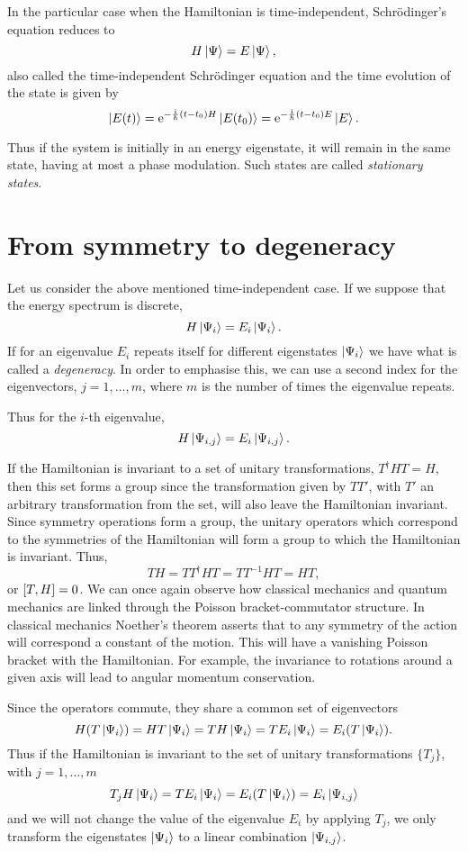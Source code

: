 \documentclass[../thesis.tex]{subfiles}
\theoremstyle{definition}
\begin{document}
In the particular case when the Hamiltonian is time-independent, Schrödinger's equation
reduces to
\[
  H \ket{\Psi} = E \ket{\Psi},
\]
also called the time-independent Schrödinger equation and the time evolution of
the state is given by
\[
  \ket{E(t)} = \operatorname{e}^{-\frac{\mathrm{i}}{\hbar} (t-t_0) H} \ket{E(t_0)}
             = \operatorname{e}^{-\frac{\mathrm{i}}{\hbar} (t-t_0) E} \ket{E}.
\]

Thus if the system is initially in an energy eigenstate, it will remain in the
same state, having at most a phase modulation. Such states are called
\emph{stationary states}.

\section{From symmetry to degeneracy}

Let us consider the above mentioned time-independent case. If we suppose that
the energy spectrum is discrete,
\[
  H \ket{\Psi_i} = E_i \ket{\Psi_i}.
\]
If for an eigenvalue \(E_i\) repeats itself for different eigenstates
\(\ket{\Psi_i}\) we have what is called a \emph{degeneracy}. In order to emphasise
this, we can use a second index for the eigenvectors, \(j=1,\dotsc,m\), where
\(m\) is the number of times the eigenvalue repeats.

Thus for the \(i\)-th eigenvalue,
\[
  H \ket{\Psi_{i,j}} = E_i \ket{\Psi_{i,j}}.
\]

If the Hamiltonian is invariant to a set of unitary transformations,
\(T^\dagger H T = H\), then this set forms a group since the transformation
given by \(T T'\), with \(T'\) an arbitrary transformation from the set,
will also leave the Hamiltonian invariant.
Since symmetry operations form a group, the unitary operators which correspond to the
symmetries of the Hamiltonian will form a group to which the Hamiltonian is invariant.
Thus,
\[
  T H = T T^\dagger H T = T T^{-1} H T = H T,
\]
or \(\comm{T}{H} = 0\). We can once again observe how classical mechanics and
quantum mechanics are linked through the Poisson bracket-commutator structure.
In classical mechanics Noether's theorem asserts that to any symmetry of the action
will correspond a constant of the motion. This will have a vanishing Poisson bracket
with the Hamiltonian. For example, the invariance to rotations around a given
axis will lead to angular momentum conservation.

Since the operators commute, they share a common set of eigenvectors
\[
  H (T \ket{\Psi_i}) = H T \ket{\Psi_i} = T H \ket{\Psi_i} = T E_i \ket{\Psi_i}
  = E_i (T \ket{\Psi_i}).
\]
Thus if the Hamiltonian is invariant to the set of unitary transformations
\( \{T_j\} \), with \(j=1,\dotsc,m\)
\[
  T_j H \ket{\Psi_i} = T E_i \ket{\Psi_i} = E_i (T \ket{\Psi_i}) = E_i \ket{\Psi_{i,j}}
\]
and we will not change the value of the eigenvalue \(E_i\) by applying \(T_j\),
we only transform the eigenstates \(\ket{\Psi_i}\) to a linear combination
\(\ket{\Psi_{i,j}}\).
\end{document}
